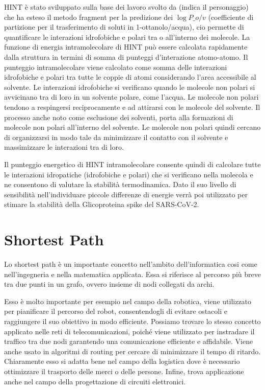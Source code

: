 HINT è stato sviluppato sulla base dei lavoro svolto da (indica il personaggio) che ha esteso il metodo fragment per la predizione dei $\log P\_o/v$ (coefficiente di partizione per il trasferimento di soluti in 1-ottanolo/acqua), cio permette di quantificare le interazioni idrofobiche e polari tra o all'interno dei molecole. La funzione di energia intramolecolare di HINT può essere calcolata rapidamente dalla struttura in termini di somma di punteggi d'interazione atomo-atomo. Il punteggio intramolecolare viene calcolato come somma delle interazioni idrofobiche e polari tra tutte le coppie di atomi considerando l'area accessibile al solvente. Le interazioni idrofobiche si verificano quando le molecole non polari si avvicinano tra di loro in un solvente polare, come l'acqua. Le molecole non polari tendono a respingersi reciprocamente e ad attirarsi con le molecole del solvente. Il processo anche noto come esclusione dei solventi, porta alla formazioni di molecole non polari all'interno del solvente. Le molecole non polari quindi cercano di organizzarsi in modo tale da minimizzare il contatto con il solvente e massimizzare le interazioni tra di loro. 

Il punteggio energetico di HINT intramolecolare consente quindi di calcolare tutte le interazioni idropatiche (idrofobiche e polari) che si verificano nella molecola e ne consentono di valutare la stabilità termodinamica. Dato il suo livello di sensibilità nell'individuare piccole differenze di energie verrà poi utilizzato per stimare la stabilità della Glicoproteina spike del SARS-CoV-2.

\section{Shortest Path}\label{sec:cap_sec_subsec}
Lo shortest path è un importante concetto nell'ambito dell'informatica cosi come nell'ingegneria e nella matematica applicata. Essa si riferisce al percorso più
breve tra due punti in un grafo, ovvero insieme di nodi collegati da archi. 

Esso è molto importante per esempio nel campo della robotica, viene utilizzato per pianificare il percorso del robot, consentendogli di evitare ostacoli e
raggiungere il suo obiettivo in modo efficiente. Possiamo trovare lo stesso concetto applicato nelle reti di telecomunicazioni, poiché viene utilizzato per instradare
il traffico tra due nodi garantendo una comunicazione efficiente e affidabile. Viene anche usato in algoritmi di routing per cercare di minimizzare il tempo di ritardo.
Chiaramente esso si adatta bene nel campo della logistica dove è necessario ottimizzare il trasporto delle merci o delle persone. Infine, trova applicazione anche nel
campo della progettazione di circuiti elettronici.

